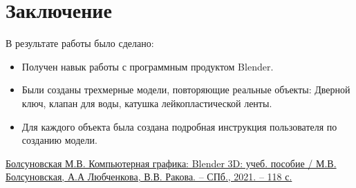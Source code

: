 \documentclass[12pt]{article}
\begin{document}
\newpage


\section{Заключение}

В результате работы было сделано:


\begin{itemize}
\item  Получен навык работы с программным продуктом Blender.

\item  Были созданы трехмерные модели, повторяющие реальные объекты: Дверной ключ, клапан для воды, катушка лейкопластической ленты.

\item Для каждого объекта была создана подробная инструкция пользователя по созданию модели.
\end{itemize}




 \newpage
\renewcommand{\refname}{Список использованных источников}
\begin{thebibliography}{99}

  

    \href{ URL:https://elib.spbstu.ru/dl/5/tr/2021/tr21-207.pdf/download/tr21-207.pdf?ysclid=lu6a0x97yn414433657}  {Болсуновская М.В. Компьютерная графика: Blender 3D: учеб. пособие / М.В.
Болсуновская, А.А Любченкова, В.В. Ракова. – СПб., 2021. – 118 с.}
    
     

\end{thebibliography}
\end{document}
